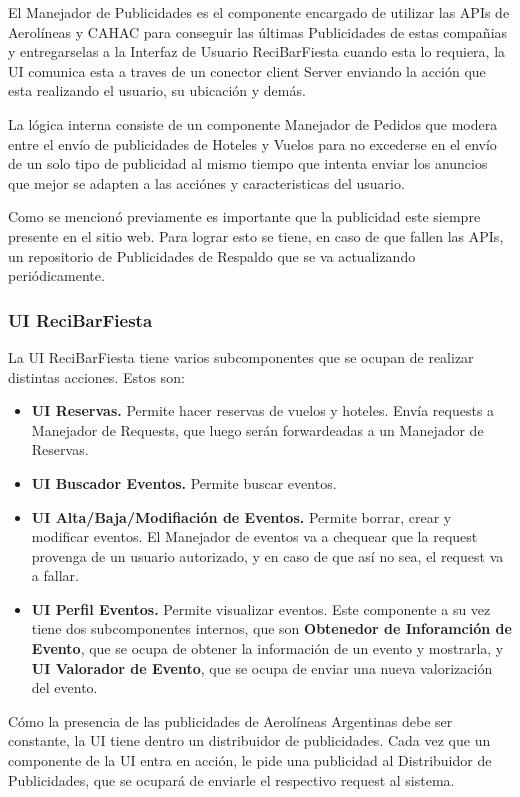 El Manejador de Publicidades es el componente encargado de utilizar las APIs de Aerolíneas y CAHAC para conseguir las últimas Publicidades de estas compañias y entregarselas a la Interfaz de Usuario ReciBarFiesta cuando esta lo requiera, la UI comunica esta a traves de un conector client Server enviando la acción que esta realizando el usuario, su ubicación y demás.

La lógica interna consiste de un componente Manejador de Pedidos que modera entre el envío de publicidades de Hoteles y Vuelos para no excederse en el envío de un solo tipo de publicidad al mismo tiempo que intenta enviar los anuncios que mejor se adapten a las acciónes y caracteristicas del usuario. 

Como se mencionó previamente es importante que la publicidad este siempre presente en el sitio web. Para lograr esto se tiene, en caso de que fallen las APIs, un repositorio de Publicidades de Respaldo que se va actualizando periódicamente.

\subsubsection{UI ReciBarFiesta}

La UI ReciBarFiesta tiene varios subcomponentes que se ocupan de realizar distintas acciones. Estos son:

\begin{itemize}

  \item \textbf{UI Reservas.} Permite hacer reservas de vuelos y hoteles. Envía requests a Manejador de Requests, que luego serán forwardeadas a un Manejador de Reservas.
  \item \textbf{UI Buscador Eventos.} Permite buscar eventos.
  \item \textbf{UI Alta/Baja/Modifiación de Eventos.} Permite borrar, crear y modificar eventos. El Manejador de eventos va a chequear que la request provenga de un usuario autorizado, y en caso de que así no sea, el request va a fallar.
  \item \textbf{UI Perfil Eventos.} Permite visualizar eventos. Este componente a su vez tiene dos subcomponentes internos, que son \textbf{Obtenedor de Inforamción de Evento}, que se ocupa de obtener la información de un evento y mostrarla, y \textbf{UI Valorador de Evento}, que se ocupa de enviar una nueva valorización del evento.
\end{itemize}

Cómo la presencia de las publicidades de Aerolíneas Argentinas debe ser constante, la UI tiene dentro un distribuidor de publicidades. Cada vez que un componente de la UI entra en acción, le pide una publicidad al Distribuidor de Publicidades, que se ocupará de enviarle el respectivo request al sistema.



